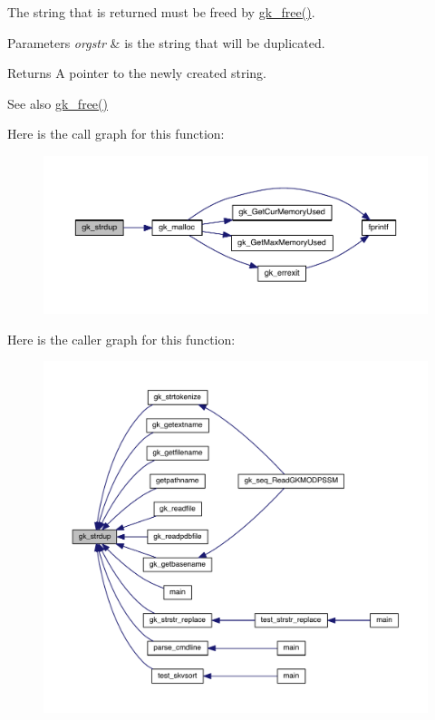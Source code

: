 The string that is returned must be freed by \hyperlink{a00077_ac8df62c4e3d0910711a9874f9cc58884}{gk\+\_\+free()}.


\begin{DoxyParams}{Parameters}
{\em orgstr} & is the string that will be duplicated. \\
\hline
\end{DoxyParams}
\begin{DoxyReturn}{Returns}
A pointer to the newly created string. 
\end{DoxyReturn}
\begin{DoxySeeAlso}{See also}
\hyperlink{a00077_ac8df62c4e3d0910711a9874f9cc58884}{gk\+\_\+free()} 
\end{DoxySeeAlso}
Here is the call graph for this function\+:\nopagebreak
\begin{figure}[H]
\begin{center}
\leavevmode
\includegraphics[width=350pt]{a00143_af62038e97ca55f14ec2557a01bd85ca2_cgraph}
\end{center}
\end{figure}
Here is the caller graph for this function\+:\nopagebreak
\begin{figure}[H]
\begin{center}
\leavevmode
\includegraphics[width=350pt]{a00143_af62038e97ca55f14ec2557a01bd85ca2_icgraph}
\end{center}
\end{figure}
\mbox{\label{a00143_adf6c1dfa83b68cea7f048086e0a585c0}} 
